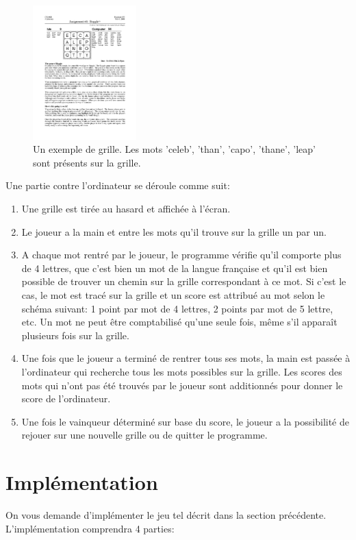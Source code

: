 \documentclass[a4paper,10pt]{article}
\begin{document}
\begin{figure}[h]
\centerline{\includegraphics[width=4cm]{grille.pdf}}
\caption{Un exemple de grille. Les mots 'celeb', 'than', 'capo',
  'thane', 'leap' sont présents sur la grille.\label{fig:grille}}
\end{figure}

Une partie contre l'ordinateur se déroule comme suit:
\begin{enumerate}
\item Une grille est tirée au hasard et affichée à l'écran.
\item Le joueur a la main et entre les mots qu'il trouve sur la
  grille un par un.
\item A chaque mot rentré par le joueur, le programme vérifie
  qu'il comporte plus de 4 lettres, que c'est bien un mot de la langue
  française et qu'il est bien possible de trouver un chemin sur la
  grille correspondant à ce mot. Si c'est le cas, le mot est tracé sur
  la grille et un score est attribué au mot selon le schéma suivant: 1
  point par mot de 4 lettres, 2 points par mot de 5 lettre, etc. Un
  mot ne peut être comptabilisé qu'une seule fois, même s'il
  apparaît plusieurs fois sur la grille.
\item Une fois que le joueur a terminé de rentrer tous ses mots, la
  main est passée à l'ordinateur qui recherche tous les mots possibles
  sur la grille. Les scores des mots qui n'ont pas été
  trouvés par le joueur sont additionnés pour donner le score de
  l'ordinateur.
\item Une fois le vainqueur déterminé sur base du score, le joueur
  a la possibilité de rejouer sur une nouvelle grille ou de quitter le
  programme.
\end{enumerate}

\section{Implémentation}

On vous demande d'implémenter le jeu tel décrit dans la section précédente.
L'implémentation comprendra 4 parties:
\end{document}
